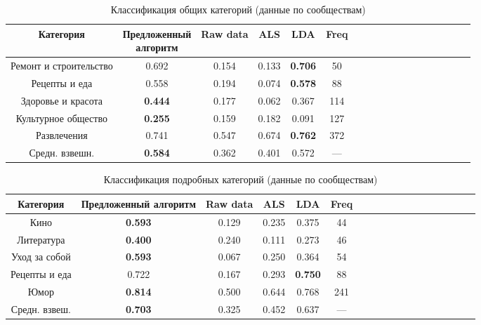 \documentclass[times,specification,annotation]{itmo-student-thesis}
\begin{document}
\begin{table}[!h]
\caption{Классификация общих категорий (данные по сообществам)}\label{tab-subs-g}
\centering
\begin{tabular}{|*{18}{c|}}\hline
    Категория & \thead{Предложенный \\ алгоритм}  & Raw data & ALS & LDA & Freq \\\hline
Ремонт и строительство     & 0.692 & 0.154 & 0.133 & \textbf{0.706} & 50 \\\hline
Рецепты и еда                       & 0.558 & 0.194 & 0.074 & \textbf{0.578} & 88 \\\hline
Здоровье и красота             & \textbf{0.444} & 0.177 & 0.062 & 0.367 & 114 \\\hline
Культурное общество         & \textbf{0.255} & 0.159 & 0.182 & 0.091 & 127  \\\hline
Развлечения                           & 0.741 & 0.547 & 0.674 & \textbf{0.762} & 372 \\\hline
Средн. взвешн.                      & \textbf{0.584} & 0.362 & 0.401 & 0.572 & --- \\\hline
\end{tabular}
\end{table}

\begin{table}[!h]
\caption{Классификация подробных категорий (данные по сообществам)}\label{tab-subs-d}
\centering
\begin{tabular}{|*{18}{c|}}\hline
Категория & Предложенный алгоритм  & Raw data & ALS & LDA & Freq \\\hline
Кино                    & \textbf{0.593} & 0.129 & 0.235 & 0.375 & 44  \\\hline
Литература       & \textbf{0.400} & 0.240 & 0.111 & 0.273 & 46 \\\hline
Уход за собой   & \textbf{0.593} & 0.067 & 0.250 & 0.364 & 54 \\\hline
Рецепты и еда  & 0.722 & 0.167 & 0.293 & \textbf{0.750} & 88 \\\hline
Юмор                  & \textbf{0.814} & 0.500 & 0.644 & 0.768 & 241 \\\hline
Средн. взвеш.   & \textbf{0.703} & 0.325 & 0.452 & 0.637  & --- \\\hline
\end{tabular}
\end{table}
\end{document}

